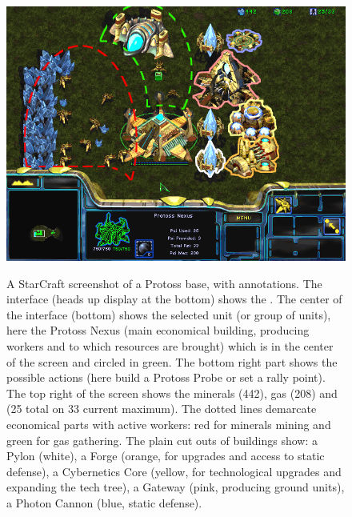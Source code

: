 \begin{figure}[!ht]
\begin{center}
\includegraphics[width=13cm]{images/SC_eco.png}
\label{fig:SC_eco}
\caption{A StarCraft screenshot of a Protoss base, with annotations. The interface (heads up display at the bottom) shows the \textit{}. The center of the interface (bottom) shows the selected unit (or group of units), here the Protoss Nexus (main economical building, producing workers and to which resources are brought) which is in the center of the screen and circled in green. The bottom right part shows the possible actions (here build a Protoss Probe or set a rally point). The top right of the screen shows the minerals (442), gas (208) and  (25 total on 33 current maximum). The dotted lines demarcate economical parts with active workers: red for minerals mining and green for gas gathering. The plain cut outs of buildings show: a Pylon (white), a Forge (orange, for upgrades and access to static defense), a Cybernetics Core (yellow, for technological upgrades and expanding the tech tree), a Gateway (pink, producing ground units), a Photon Cannon (blue, static defense).}
\end{center}
\end{figure}

